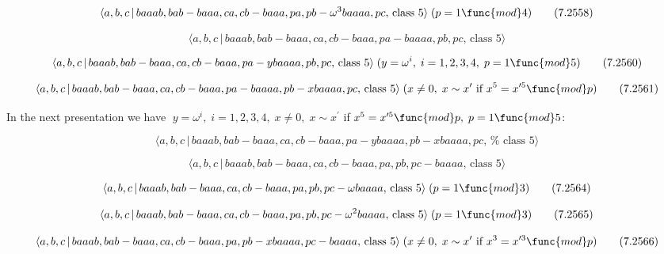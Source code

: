 \documentclass[10pt]{article}
\begin{document}
\begin{equation}
\langle a,b,c\,|\,baaab,bab-baaa,ca,cb-baaa,pa,pb-\omega ^{3}baaaa,pc,\,%
\text{class }5\rangle \;(p=1\func{mod}4)  \tag{7.2558}
\end{equation}

\begin{equation}
\langle a,b,c\,|\,baaab,bab-baaa,ca,cb-baaa,pa-baaaa,pb,pc,\,\text{class }%
5\rangle  \tag{7.2559}
\end{equation}

\begin{equation}
\langle a,b,c\,|\,baaab,bab-baaa,ca,cb-baaa,pa-ybaaaa,pb,pc,\,\text{class }%
5\rangle \;(y=\omega ^{i},\;i=1,2,3,4,\;p=1\func{mod}5)  \tag{7.2560}
\end{equation}

\begin{equation}
\langle a,b,c\,|\,baaab,bab-baaa,ca,cb-baaa,pa-baaaa,pb-xbaaaa,pc,\,\text{%
class }5\rangle \;(x\neq 0,\;x\sim x^{\prime }\text{ if }x^{5}=x^{\prime 5}%
\func{mod}p)  \tag{7.2561}
\end{equation}

In the next presentation we have $\;y=\omega ^{i},\;i=1,2,3,4,\;x\neq
0,\;x\sim x^{\prime }$ if $x^{5}=x^{\prime 5}\func{mod}p,\;p=1\func{mod}5$:

\begin{equation}
\langle a,b,c\,|\,baaab,bab-baaa,ca,cb-baaa,pa-ybaaaa,pb-xbaaaa,pc,\,\text{%
class }5\rangle  \tag{7.2562}
\end{equation}

\begin{equation}
\langle a,b,c\,|\,baaab,bab-baaa,ca,cb-baaa,pa,pb,pc-baaaa,\,\text{class }%
5\rangle  \tag{7.2563}
\end{equation}

\begin{equation}
\langle a,b,c\,|\,baaab,bab-baaa,ca,cb-baaa,pa,pb,pc-\omega baaaa,\,\text{%
class }5\rangle \;(p=1\func{mod}3)  \tag{7.2564}
\end{equation}

\begin{equation}
\langle a,b,c\,|\,baaab,bab-baaa,ca,cb-baaa,pa,pb,pc-\omega ^{2}baaaa,\,%
\text{class }5\rangle \;(p=1\func{mod}3)  \tag{7.2565}
\end{equation}

\begin{equation}
\langle a,b,c\,|\,baaab,bab-baaa,ca,cb-baaa,pa,pb-xbaaaa,pc-baaaa,\,\text{%
class }5\rangle \;(x\neq 0,\;x\sim x^{\prime }\text{ if }x^{3}=x^{\prime 3}%
\func{mod}p)  \tag{7.2566}
\end{equation}
\end{document}
